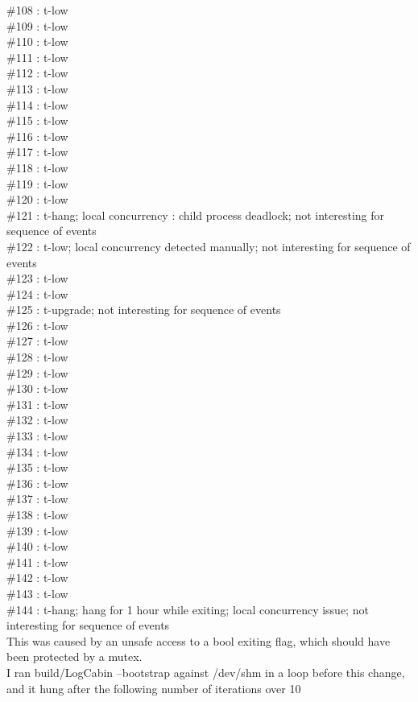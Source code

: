 \#108 : t-low\\
\#109 : t-low\\
\#110 : t-low\\
\#111 : t-low\\
\#112 : t-low\\
\#113 : t-low\\
\#114 : t-low\\
\#115 : t-low\\
\#116 : t-low\\
\#117 : t-low\\
\#118 : t-low\\
\#119 : t-low\\
\#120 : t-low\\
\#121 : t-hang; local concurrency : child process deadlock; not interesting for sequence of events\\
\#122 : t-low; local concurrency detected manually; not interesting for sequence of events\\
\#123 : t-low\\
\#124 : t-low\\
\#125 : t-upgrade; not interesting for sequence of events\\
\#126 : t-low\\
\#127 : t-low\\
\#128 : t-low\\
\#129 : t-low\\
\#130 : t-low\\
\#131 : t-low\\
\#132 : t-low\\
\#133 : t-low\\
\#134 : t-low\\
\#135 : t-low\\
\#136 : t-low\\
\#137 : t-low\\
\#138 : t-low\\
\#139 : t-low\\
\#140 : t-low\\
\#141 : t-low\\
\#142 : t-low\\
\#143 : t-low\\
\#144 : t-hang; hang for 1 hour while exiting; local concurrency issue; 
not interesting for sequence of events\\
This was caused by an unsafe access to a bool exiting flag, which should
have been protected by a mutex.\\
I ran build/LogCabin --bootstrap against /dev/shm in a loop before this
change, and it hung after the following number of iterations over 10
